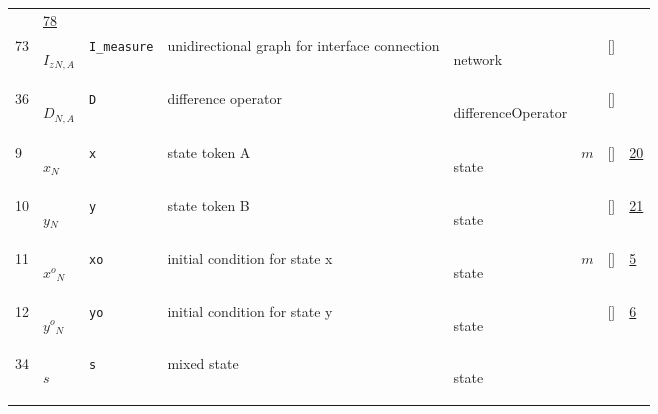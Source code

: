 \begin{longtable}{|p{1cm}|p{3cm}|p{3cm}|p{7cm}|p{3.0cm}|p{3cm}|p{2cm}|p{1cm}|}
             & \hyperlink{"e:78"}{ 78 }
                 \\
    73
             & \hypertarget{"v:73"}{ $ {{I_z}}{_{N, A}} $}
             & \verb|I_measure|
             & unidirectional graph for interface connection
             & \begin{lay}network \end{lay}
             & $  $
             & []
             & \\
    36
             & \hypertarget{"v:36"}{ $ {D}{_{N, A}} $}
             & \verb|D|
             & difference operator 
             & \begin{lay}differenceOperator \end{lay}
             & $  $
             & []
             & \\
    9
             & \hypertarget{"v:9"}{ $ {x}{_{N}} $}
             & \verb|x|
             & state token A
             & \begin{lay}state \end{lay}
             & $ m  $
             & []
             & \hyperlink{"e:20"}{ 20 }
                 \\
    10
             & \hypertarget{"v:10"}{ $ {y}{_{N}} $}
             & \verb|y|
             & state token B
             & \begin{lay}state \end{lay}
             & $  $
             & []
             & \hyperlink{"e:21"}{ 21 }
                 \\
    11
             & \hypertarget{"v:11"}{ $ {{x^o}}{_{N}} $}
             & \verb|xo|
             & initial condition for state x
             & \begin{lay}state \end{lay}
             & $ m  $
             & []
             & \hyperlink{"e:5"}{ 5 }
                 \\
    12
             & \hypertarget{"v:12"}{ $ {{y^o}}{_{N}} $}
             & \verb|yo|
             & initial condition for state y
             & \begin{lay}state \end{lay}
             & $  $
             & []
             & \hyperlink{"e:6"}{ 6 }
                 \\
    34
             & \hypertarget{"v:34"}{ $ {s}{_{}} $}
             & \verb|s|
             & mixed state
             & \begin{lay}state \end{lay}
             & $  $

\end{longtable}
